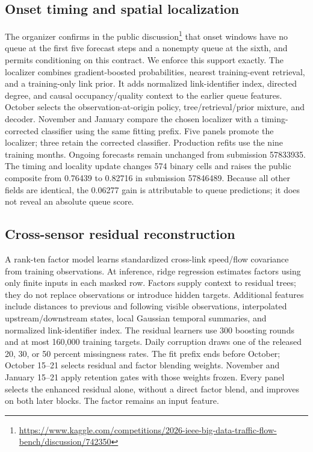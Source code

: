 \documentclass[conference]{IEEEtran}
\begin{document}
\subsection{Onset timing and spatial localization}
The organizer confirms in the public discussion\footnote{\url{https://www.kaggle.com/competitions/2026-ieee-big-data-traffic-flow-bench/discussion/742350}} that onset windows have no queue at the first five forecast steps and a nonempty queue at the sixth, and permits conditioning on this contract. We enforce this support exactly. The localizer combines gradient-boosted probabilities, nearest training-event retrieval, and a training-only link prior. It adds normalized link-identifier index, directed degree, and causal occupancy/quality context to the earlier queue features. October selects the observation-at-origin policy, tree/retrieval/prior mixture, and decoder. November and January compare the chosen localizer with a timing-corrected classifier using the same fitting prefix. Five panels promote the localizer; three retain the corrected classifier. Production refits use the nine training months. Ongoing forecasts remain unchanged from submission 57833935. The timing and locality update changes 574 binary cells and raises the public composite from 0.76439 to 0.82716 in submission 57846489. Because all other fields are identical, the 0.06277 gain is attributable to queue predictions; it does not reveal an absolute queue score.

\subsection{Cross-sensor residual reconstruction}
A rank-ten factor model learns standardized cross-link speed/flow covariance from training observations. At inference, ridge regression estimates factors using only finite inputs in each masked row. Factors supply context to residual trees; they do not replace observations or introduce hidden targets. Additional features include distances to previous and following visible observations, interpolated upstream/downstream states, local Gaussian temporal summaries, and normalized link-identifier index. The residual learners use 300 boosting rounds and at most 160,000 training targets. Daily corruption draws one of the released 20, 30, or 50 percent missingness rates. The fit prefix ends before October; October 15--21 selects residual and factor blending weights. November and January 15--21 apply retention gates with those weights frozen. Every panel selects the enhanced residual alone, without a direct factor blend, and improves on both later blocks. The factor remains an input feature.
\end{document}
